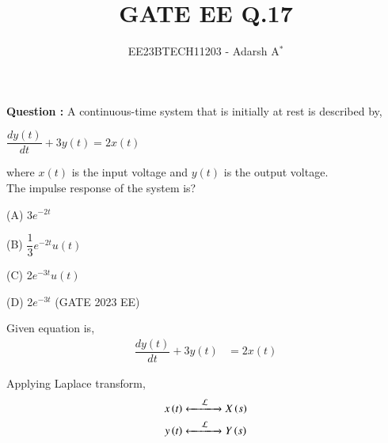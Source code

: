 \documentclass[journal,12pt,onecolumn]{IEEEtran}
\theoremstyle{remark}
\begin{document}
	
	
	\vspace{3cm}
	
	\title{GATE EE Q.17}
	\author{EE23BTECH11203 - Adarsh A$^{*}$%
	}
	\maketitle
	\bigskip
	
	\renewcommand{\thefigure}{\theenumi}
	\renewcommand{\thetable}{\theenumi}
	
	
	\vspace{0.2cm}
	\linespread{1.1}
	
	
	\textbf{ Question : }
	 A continuous-time system that is initially at rest is described by,
	\begin{center}
		$\dfrac{dy(t)}{dt} + 3y(t) = 2x(t)$
	\end{center}
	where $x(t)$ is the input voltage and $y(t)$ is the output voltage.\\ 
	The impulse response of the system is?
	
	\vspace{0.2cm}
	
	(A) 3$e^{-2t}$
	
	\vspace{0.3cm}
	
	(B) $\dfrac{1}{3}e^{-2t} u(t)$
	
	\vspace{0.3cm}
	
	(C) 2$e^{-3t} u(t)$
	
	\vspace{0.2cm}
	
	(D) 2$e^{-3t}$ \hfill(GATE 2023 EE)
	
	\vspace{0.2cm}
	
	\solution
	
	
	
	
	Given equation is,
	\begin{align}
		\dfrac{dy(t)}{dt} + 3y(t) &= 2x(t)
	\end{align}
	
	Applying Laplace transform,
	\begin{align}
		x\left(t\right) &
		\xleftarrow[]{\hspace{0.4cm}{\mathcal{L}}\hspace{0.1cm}}\xrightarrow[]{}
		X\left(s\right)\\
		y\left(t\right) &
		\xleftarrow[]{\hspace{0.4cm}{\mathcal{L}}\hspace{0.1cm}}\xrightarrow[]{}
		Y\left(s\right)
	\end{align}
	
\end{document}
